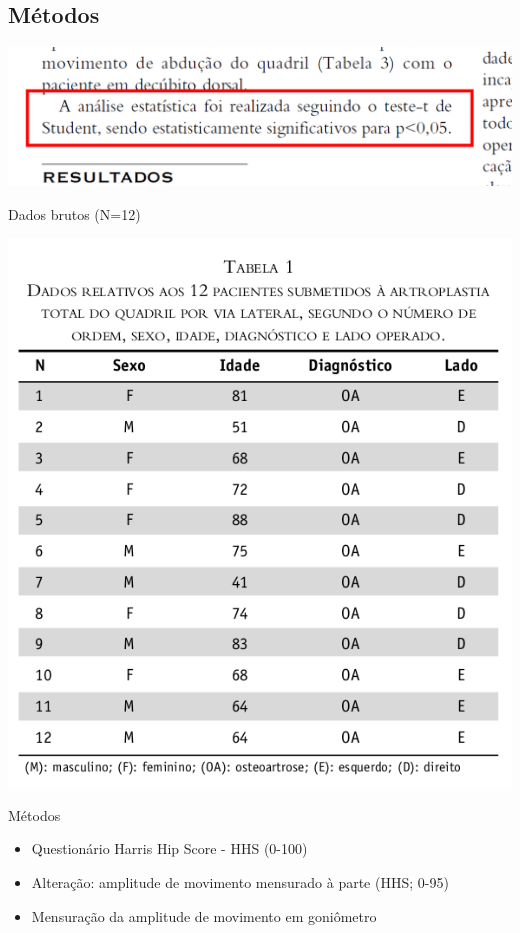 \documentclass{beamer}
\begin{document}
\subsection{Métodos}

\begin{frame}{}
  \begin{center}
    \includegraphics[width=\textwidth]{figuras/metodologia}
  \end{center}
\end{frame}

\begin{frame}{Dados brutos (N=12)}
  \begin{center}
    \includegraphics[height=.9\textheight]{figuras/tabela1}
  \end{center}
\end{frame}

\begin{frame}{Métodos}
  \begin{itemize}
  \item Questionário Harris Hip Score - HHS (0-100)
  \item Alteração: amplitude de movimento mensurado à parte (HHS; 0-95)
  \item Mensuração da amplitude de movimento em goniômetro
  \end{itemize}
\end{frame}
\end{document}
